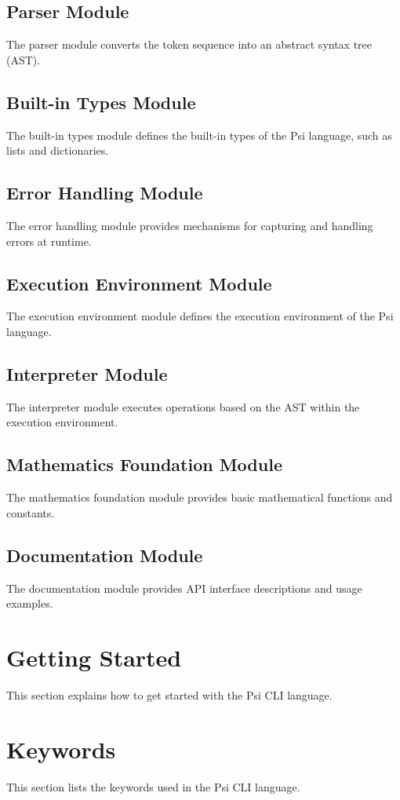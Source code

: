 \documentclass[conference]{IEEEtran}
\begin{document}
\subsection{Parser Module}
The parser module converts the token sequence into an abstract syntax tree (AST).

\subsection{Built-in Types Module}
The built-in types module defines the built-in types of the Psi language, such as lists and dictionaries.

\subsection{Error Handling Module}
The error handling module provides mechanisms for capturing and handling errors at runtime.

\subsection{Execution Environment Module}
The execution environment module defines the execution environment of the Psi language.

\subsection{Interpreter Module}
The interpreter module executes operations based on the AST within the execution environment.

\subsection{Mathematics Foundation Module}
The mathematics foundation module provides basic mathematical functions and constants.

\subsection{Documentation Module}
The documentation module provides API interface descriptions and usage examples.

\section{Getting Started}
This section explains how to get started with the Psi CLI language.

\section{Keywords}
This section lists the keywords used in the Psi CLI language.
\end{document}
